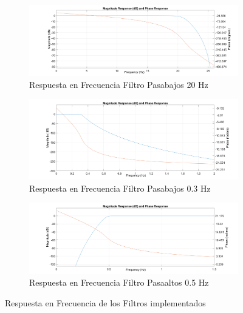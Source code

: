 \documentclass[11pt]{report}
\begin{document}
\begin{figure}[H]
 
\begin{subfigure}{1\textwidth}
\includegraphics[width=1\linewidth]{filtro_pasabajos20Hz} 
\caption{Respuesta en Frecuencia Filtro Pasabajos 20 Hz}
\label{fig:subim1}
\end{subfigure}
\begin{subfigure}{1\textwidth}
\includegraphics[width=1\linewidth]{filtro_pasabajos0_3Hz}
\caption{Respuesta en Frecuencia Filtro Pasabajos 0.3 Hz}
\label{fig:subim2}
\end{subfigure}
 \begin{subfigure}{1\textwidth}
\includegraphics[width=1\linewidth]{pasaaltas0_5Hz}
\caption{Respuesta en Frecuencia Filtro Pasaaltos 0.5 Hz}
\label{fig:subim3}
\end{subfigure}

\caption{Respuesta en Frecuencia de los Filtros implementados}
\label{fig:image2}
\end{figure}
\end{document}
